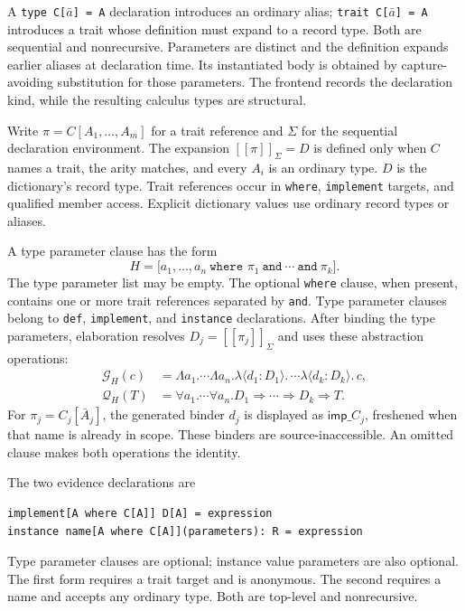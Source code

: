 \documentclass[10pt,a4paper]{article}
\newcommand{\ilam}[3]{\lambda\langle#1:#2\rangle.\,#3}
\newcommand{\kw}[1]{\mathsf{#1}}
\newcommand{\traittype}[1]{[\![#1]\!]}
\begin{document}
A \texttt{type C[}$\bar a$\texttt{] = A} declaration introduces an ordinary alias;
\texttt{trait C[}$\bar a$\texttt{] = A} introduces a trait whose definition must
expand to a record type. Both are sequential and nonrecursive. Parameters are distinct
and the definition expands earlier aliases at declaration time. Its instantiated body
is obtained by capture-avoiding substitution for those parameters. The frontend records
the declaration kind, while the resulting calculus types are structural.

Write $\pi=C[A_1,\ldots,A_m]$ for a trait reference and $\Sigma$ for the sequential
declaration environment. The expansion $\traittype{\pi}_\Sigma=D$ is defined only
when $C$ names a trait, the arity matches, and every $A_i$ is an ordinary type.
$D$ is the dictionary's record type. Trait references occur in \texttt{where},
\texttt{implement} targets, and qualified member access. Explicit dictionary values
use ordinary record types or aliases.

A type parameter clause has the form
\[
 H=\texttt{[}a_1,\ldots,a_n\ \texttt{where }\pi_1\ \texttt{and}\ \cdots
 \ \texttt{and}\ \pi_k\texttt{]}.
\]
The type parameter list may be empty. The optional \texttt{where} clause, when present,
contains one or more trait references separated by \texttt{and}. Type parameter clauses
belong to \texttt{def}, \texttt{implement}, and \texttt{instance} declarations.
After binding the type parameters, elaboration resolves $D_j=\traittype{\pi_j}_\Sigma$
and uses these abstraction operations:
\[
\begin{aligned}
\mathcal G_H(c)
 &=\Lambda a_1.\cdots\Lambda a_n.
   \ilam{d_1}{D_1}{\cdots\ilam{d_k}{D_k}{c}},\\
\mathcal Q_H(T)
 &=\forall a_1.\cdots\forall a_n.
   D_1\Rightarrow\cdots\Rightarrow D_k\Rightarrow T.
\end{aligned}
\]
For $\pi_j=C_j[\bar A_j]$, the generated binder $d_j$ is displayed as
$\kw{imp\_}C_j$, freshened when that name is already in scope. These binders are
source-inaccessible. An omitted clause makes both operations the identity.

The two evidence declarations are
\begin{lstlisting}
implement[A where C[A]] D[A] = expression
instance name[A where C[A]](parameters): R = expression
\end{lstlisting}
Type parameter clauses are optional; instance value parameters are also optional.
The first form requires a trait target and is anonymous. The second requires a name
and accepts any ordinary type. Both are top-level and nonrecursive.
\end{document}
